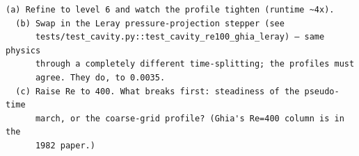 \begin{explore}
\begin{verbatim}
(a) Refine to level 6 and watch the profile tighten (runtime ~4x).
  (b) Swap in the Leray pressure-projection stepper (see
      tests/test_cavity.py::test_cavity_re100_ghia_leray) — same physics
      through a completely different time-splitting; the profiles must
      agree. They do, to 0.0035.
  (c) Raise Re to 400. What breaks first: steadiness of the pseudo-time
      march, or the coarse-grid profile? (Ghia's Re=400 column is in the
      1982 paper.)
\end{verbatim}
\end{explore}
